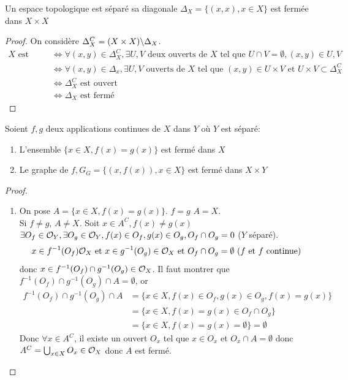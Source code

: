 \documentclass[]{report}
\begin{document}
    \begin{prop}{}{}
        Un espace topologique est séparé \ssi sa diagonale $\Delta_X=\{(x,x),x\in X\}$ est fermée dans $X\times X$
    \end{prop}

    \begin{proof}
        On considère $\Delta_X^C=(X\times X)\backslash \Delta_X$.
        \begin{align*}
            X\text{ est séparé }&\iff\forall (x,y)\in \Delta_X^C,\exists U,V \text{ deux ouverts de $X$ tel que }U\cap V=\emptyset,(x,y)\in U,V\\
            &\iff\forall(x,y)\in\Delta_x,\exists U,V\text{ ouverts de $X$ tel que }(x,y)\in U\times V\text{ et }U\times V\subset \Delta_X^C\\
            &\iff\Delta_X^C\text{ est ouvert}\\
            &\iff \Delta_X\text{ est fermé}
        \end{align*}
    \end{proof}

    \begin{cor}{}{}
        Soient $f,g$ deux applications continues de $X$ dans $Y$ où $Y$ est séparé:
        \begin{enumerate}
            \item L'ensemble $\{x\in X,f(x)=g(x)\}$ est fermé dans $X$
            \item Le graphe de $f, G_G=\{(x,f(x)),x\in X\}$ est fermé dans $X\times Y$
        \end{enumerate}
    \end{cor}

    \begin{proof}
        \begin{enumerate}
            \item On pose $A=\{x\in X,f(x)=g(x)\}$. $f=g$ \ssi $A=X$.\\
            Si $f\neq g$, $A\neq X$. Soit $x\in A^C,f(x)\neq g(x)$\\
            $\exists O_f\in \mathcal{O}_Y,\exists O_g\in \mathcal{O}_Y,f(x)\in O_f,g(x)\in O_g,O_f\cap O_g=0$ ($Y$ séparé).\\
            \[x\in f^{-1}(O_f)\mathcal{O}_X\text{ et }x\in g^{-1}(O_g)\in \mathcal{O}_X\text{ et }O_f\cap O_g=\emptyset\text{ ($f$ et $f$ continue)}\]
            donc $x\in f^{-1}(O_f)\cap g^{-1}(O_g)\in \mathcal{O}_X$. Il faut montrer que $f^{-1}(O_f)\cap g^{-1}(O_g)\cap A=\emptyset$, or
            \begin{align*}
                f^{-1}(O_f)\cap g^{-1}(O_g)\cap A&=\{x\in X,f(x)\in O_f,g(x)\in O_g,f(x)=g(x)\}\\
                &=\{x\in X,f(x)=g(x)\in O_f\cap O_g\}\\
                &=\{x\in X,f(x)=g(x)=\emptyset\}=\emptyset
            \end{align*} 
            Donc $\forall x\in A^C$, il existe un ouvert $O_x$ tel que $x\in O_x$ et $O_x\cap A=\emptyset$ donc $A^C=\bigcup_{x\in X}O_x\in \mathcal{O}_X$ donc $A$ est fermé.
        \end{enumerate}
    \end{proof}
\end{document}
